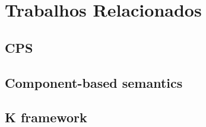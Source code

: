 \chapter{Trabalhos Relacionados}
\section{CPS}
\section{Component-based semantics}
\section{K framework}